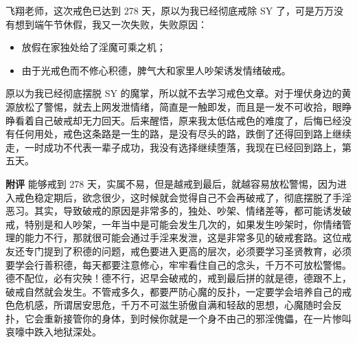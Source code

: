 \begin{case}
    飞翔老师，这次戒色已达到 278 天，原以为我已经彻底戒除 SY 了，可是万万没有想到端午节休假，我又一次失败，失败原因：\begin{itemize}
        \item 放假在家独处给了淫魔可乘之机；
        \item 由于光戒色而不修心积德，脾气大和家里人吵架诱发情绪破戒。
    \end{itemize} 原以为我已经彻底摆脱 SY 的魔掌，所以就不去学习戒色文章。对于埋伏身边的黄源放松了警惕，就去上网发泄情绪，简直是一触即发，而且是一发不可收拾，眼睁睁看着自己破戒却无力回天。后来醒悟，原来我太低估戒色的难度了，后悔已经没有任何用处，戒色这条路是一生的路，是没有尽头的路，跌倒了还得回到路上继续走，一时成功不代表一辈子成功，我没有选择继续堕落，我现在已经回到路上，第五天。

    \textbf{附评} 能够戒到 278 天，实属不易，但是越戒到最后，就越容易放松警惕，因为进入戒色稳定期后，欲念很少，这时候就会觉得自己不会再破戒了，彻底摆脱了手淫恶习。其实，导致破戒的原因是非常多的，独处、吵架、情绪差等，都可能诱发破戒，特别是和人吵架，一年当中是可能会发生几次的，如果发生吵架时，你情绪管理的能力不行，那就很可能会通过手淫来发泄，这是非常多见的破戒套路。这位戒友还专门提到了积德的问题，戒色要进入更高的层次，必须要学习圣贤教育，必须要学会行善积德，每天都要注意修心，牢牢看住自己的念头，千万不可放松警惕。德不配位，必有灾殃！德不行，迟早会破戒的，戒到最后拼的就是德，德跟不上，破戒自然就会发生。不管戒多久，都要严防心魔的反扑，一定要学会培养自己的戒色危机感，所谓居安思危，千万不可滋生骄傲自满和轻敌的思想，心魔随时会反扑，它会重新接管你的身体，到时候你就是一个身不由己的邪淫傀儡，在一片惨叫哀嚎中跌入地狱深处。
\end{case}

